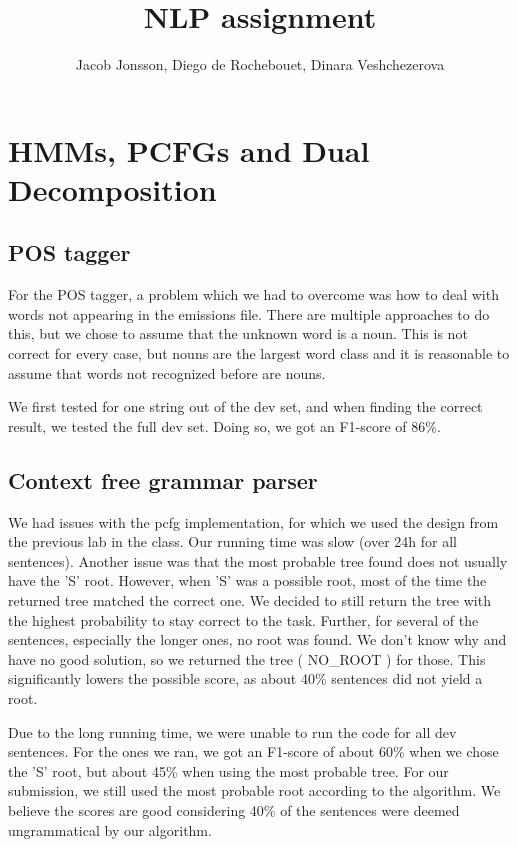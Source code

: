 \documentclass{article}
\title{NLP assignment}
\author{Jacob Jonsson, Diego de Rochebouet, Dinara Veshchezerova}
\begin{document}
\maketitle
\section{HMMs, PCFGs and Dual Decomposition}

\subsection{POS tagger}
For the POS tagger, a problem which we had to overcome was how to deal with words not appearing in the emissions file. There are multiple approaches to do this, but we chose to assume that the unknown word is a noun. This is not correct for every case, but nouns are the largest word class and it is reasonable to assume that words not recognized before are nouns.

We first tested for one string out of the dev set, and when finding the correct result, we tested the full dev set. Doing so, we got an F1-score of 86\%.

\subsection{Context free grammar parser}

We had issues with the pcfg implementation, for which we used the design from the previous lab in the class. Our running time was slow (over 24h for all sentences). Another issue was that the most probable tree found does not usually have the 'S' root. However, when 'S' was a possible root, most of the time the returned tree matched the correct one. We decided to still return the tree with the highest probability to stay correct to the task. Further, for several of the sentences, especially the longer ones, no root was found. We don't know why and have no good solution, so we returned the tree ( NO\_ROOT ) for those. This significantly lowers the possible score, as about 40\% sentences did not yield a root.

Due to the long running time, we were unable to run the code for all dev sentences. For the ones we ran, we got an F1-score of about 60\% when we chose the 'S' root, but about 45\% when using the most probable tree. For our submission, we still used the most probable root according to the algorithm. We believe the scores are good considering 40\% of the sentences were deemed ungrammatical by our algorithm.
\end{document}
